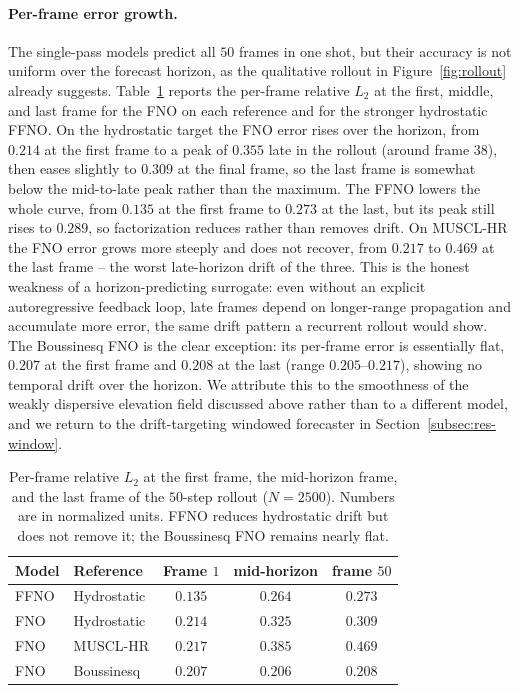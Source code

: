 \paragraph{Per-frame error growth.}
The single-pass models predict all $50$ frames in one shot, but their accuracy is not uniform over the forecast horizon, as the qualitative rollout in Figure~\ref{fig:rollout} already suggests. Table~\ref{tab:perframe} reports the per-frame relative $L_2$ at the first, middle, and last frame for the FNO on each reference and for the stronger hydrostatic FFNO. On the hydrostatic target the FNO error rises over the horizon, from $0.214$ at the first frame to a peak of $0.355$ late in the rollout (around frame $38$), then eases slightly to $0.309$ at the final frame, so the last frame is somewhat below the mid-to-late peak rather than the maximum. The FFNO lowers the whole curve, from $0.135$ at the first frame to $0.273$ at the last, but its peak still rises to $0.289$, so factorization reduces rather than removes drift. On MUSCL-HR the FNO error grows more steeply and does not recover, from $0.217$ to $0.469$ at the last frame -- the worst late-horizon drift of the three. This is the honest weakness of a horizon-predicting surrogate: even without an explicit autoregressive feedback loop, late frames depend on longer-range propagation and accumulate more error, the same drift pattern a recurrent rollout would show. The Boussinesq FNO is the clear exception: its per-frame error is essentially flat, $0.207$ at the first frame and $0.208$ at the last (range $0.205$--$0.217$), showing no temporal drift over the horizon. We attribute this to the smoothness of the weakly dispersive elevation field discussed above rather than to a different model, and we return to the drift-targeting windowed forecaster in Section~\ref{subsec:res-window}.

\begin{table}[!htbp]
\centering
\caption{Per-frame relative $L_2$ at the first frame, the mid-horizon frame, and the last frame of the $50$-step rollout ($N = 2500$). Numbers are in normalized units. FFNO reduces hydrostatic drift but does not remove it; the Boussinesq FNO remains nearly flat.}
\label{tab:perframe}
\begin{tabular}{llccc}
    \toprule
    Model & Reference & Frame $1$ & mid-horizon & frame $50$ \\
    \midrule
    FFNO & Hydrostatic & $0.135$ & $0.264$ & $0.273$ \\
    FNO  & Hydrostatic & $0.214$ & $0.325$ & $0.309$ \\
    FNO  & MUSCL-HR    & $0.217$ & $0.385$ & $0.469$ \\
    FNO  & Boussinesq  & $0.207$ & $0.206$ & $0.208$ \\
    \bottomrule
\end{tabular}
\end{table}

